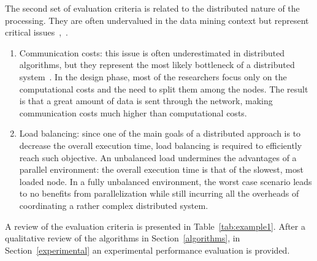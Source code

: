 The second set of evaluation criteria is related to the distributed nature of
the processing. They are often undervalued in the data mining context but
represent critical
issues~\cite{afrati2012designing},~\cite{leskovec2014mining}.

\begin{enumerate}

\item Communication costs: this issue is often underestimated in distributed
algorithms, but they represent the most likely bottleneck of a distributed
system~\cite{sarma2013upper}. In the design phase, most of the researchers focus
only on the computational costs and the need to split them among the nodes. The
result is that a great amount of data is sent through the network, making
communication costs much higher than computational costs.

\item Load balancing: since one of the main goals of a distributed
approach is to decrease the overall execution time, load balancing is required
to efficiently reach such objective. An unbalanced load
undermines the advantages of a parallel environment: the overall execution time
is that of the slowest, most loaded node. In a fully unbalanced environment, the
worst case scenario leads to no benefits from parallelization while still
incurring all the overheads of coordinating a rather complex distributed system.

\end{enumerate}

A review of the evaluation criteria is presented in
Table~\ref{tab:example1}. After a qualitative review of the algorithms in
Section~\ref{algorithms}, in Section~\ref{experimental} an experimental
performance evaluation is provided.

